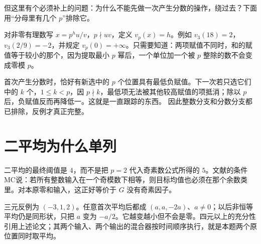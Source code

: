 但这里有个必须补上的问题：为什么不能先做一次产生分数的操作，绕过去？下面用“分母里有几个 $p$”排除它。

对非零有理数写 $x=p^h u/v$，$p\nmid uv$，定义 $v_p(x)=h$。例如 $v_3(18)=2$，$v_3(2/9)=-2$，并规定 $v_p(0)=+\infty$。只需要知道：两项赋值不同时，和的赋值等于较小的那个，因为提取最小 $p$ 幂后，一个单位加一个被 $p$ 整除的数不会变成零模 $p$。

首次产生分数时，恰好有新选中的 $p$ 个位置具有最低负赋值。下一次若只选它们中的 $k$ 个，$1\le k<p$，因 $p\nmid k$，最低项无法被其他较高赋值的项抵消；除以 $p$ 后，负赋值反而再降低一。这就是一直跟踪的东西。
因此整数分支和分数分支都已排除，反例才真正完整。

\section{二平均为什么单列}
二平均的最终阈值是 $4$，而不是把 $p=2$ 代入奇素数公式所得的 $5$。文献\cite{mixing}的条件MC说：若所有整数输入在一个奇模数下相等，则目标均值也必须在那个余数类里。对本原零和输入，这正好等价于 $G$ 没有奇素因子。

三元反例为 $(-3,1,2)$。任意首次平均后都成 $(a,a,-2a)$、$a\ne0$；以后非恒等平均仍是同形状，只把 $a$ 变为 $-a/2$。它越变越小但不会是零。四元以上的充分性引用上述论文；其两个输入、两个输出的混合器按时间顺序执行，就是本题两个原位置同时取平均。

